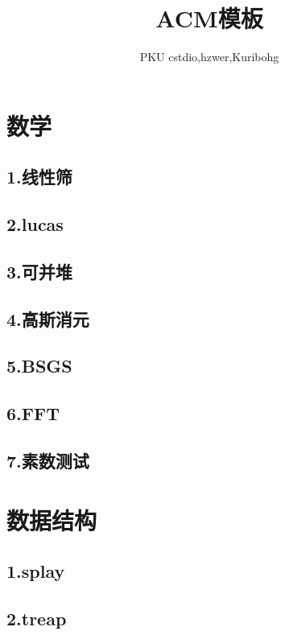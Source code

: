 \documentclass[UTF8,a4paper]{ctexart}
\author{PKU cstdio,hzwer,Kuribohg}
\title{\Huge ACM模板}
\begin{document}
 
\maketitle
\tableofcontents
\section{数学}

\subsection{1.线性筛}

\subsection{2.lucas}

\subsection{3.可并堆}

\subsection{4.高斯消元}

\subsection{5.BSGS}

\subsection{6.FFT}

\subsection{7.素数测试}

\section{数据结构}

\subsection{1.splay}

\subsection{2.treap}
\end{document}
